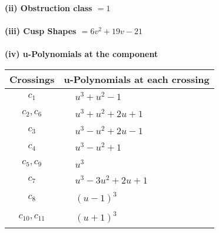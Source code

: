 \documentclass[1p]{elsarticle_modified}
\theoremstyle{definition}
\begin{document}
\flushleft \textbf{(ii) Obstruction class $= 1$}\\~\\
\flushleft \textbf{(iii) Cusp Shapes $= 6 v^2+19 v-21$}\\~\\
\newpage\renewcommand{\arraystretch}{1}
\flushleft \textbf{(iv) u-Polynomials at the component}\newline \\
\begin{tabular}{m{50pt}|m{274pt}}
Crossings & \hspace{64pt}u-Polynomials at each crossing \\
\hline $$\begin{aligned}c_{1}\end{aligned}$$&$\begin{aligned}
&u^3+u^2-1
\end{aligned}$\\
\hline $$\begin{aligned}c_{2},c_{6}\end{aligned}$$&$\begin{aligned}
&u^3+u^2+2 u+1
\end{aligned}$\\
\hline $$\begin{aligned}c_{3}\end{aligned}$$&$\begin{aligned}
&u^3- u^2+2 u-1
\end{aligned}$\\
\hline $$\begin{aligned}c_{4}\end{aligned}$$&$\begin{aligned}
&u^3- u^2+1
\end{aligned}$\\
\hline $$\begin{aligned}c_{5},c_{9}\end{aligned}$$&$\begin{aligned}
&u^3
\end{aligned}$\\
\hline $$\begin{aligned}c_{7}\end{aligned}$$&$\begin{aligned}
&u^3-3 u^2+2 u+1
\end{aligned}$\\
\hline $$\begin{aligned}c_{8}\end{aligned}$$&$\begin{aligned}
&(u-1)^3
\end{aligned}$\\
\hline $$\begin{aligned}c_{10},c_{11}\end{aligned}$$&$\begin{aligned}
&(u+1)^3
\end{aligned}$\\
\hline
\end{tabular}\\~\\
\end{document}
